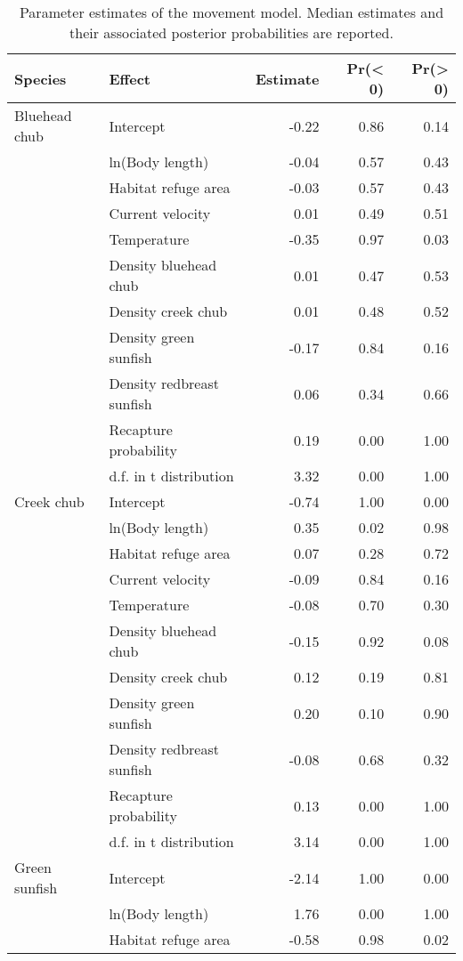 \begin{table}[ht]
\centering
\caption{Parameter estimates of the movement model. Median estimates and their associated posterior probabilities are reported.} 
\label{tab:coefficients}
\begin{tabular}{llrrr}
  \hline
Species & Effect & Estimate & Pr(< 0) & Pr(> 0) \\ 
  \hline
Bluehead chub & Intercept & -0.22 & 0.86 & 0.14 \\ 
   & ln(Body length) & -0.04 & 0.57 & 0.43 \\ 
   & Habitat refuge area & -0.03 & 0.57 & 0.43 \\ 
   & Current velocity & 0.01 & 0.49 & 0.51 \\ 
   & Temperature & -0.35 & 0.97 & 0.03 \\ 
   & Density bluehead chub & 0.01 & 0.47 & 0.53 \\ 
   & Density creek chub & 0.01 & 0.48 & 0.52 \\ 
   & Density green sunfish & -0.17 & 0.84 & 0.16 \\ 
   & Density redbreast sunfish & 0.06 & 0.34 & 0.66 \\ 
   & Recapture probability & 0.19 & 0.00 & 1.00 \\ 
   & d.f. in t distribution & 3.32 & 0.00 & 1.00 \\ 
  Creek chub & Intercept & -0.74 & 1.00 & 0.00 \\ 
   & ln(Body length) & 0.35 & 0.02 & 0.98 \\ 
   & Habitat refuge area & 0.07 & 0.28 & 0.72 \\ 
   & Current velocity & -0.09 & 0.84 & 0.16 \\ 
   & Temperature & -0.08 & 0.70 & 0.30 \\ 
   & Density bluehead chub & -0.15 & 0.92 & 0.08 \\ 
   & Density creek chub & 0.12 & 0.19 & 0.81 \\ 
   & Density green sunfish & 0.20 & 0.10 & 0.90 \\ 
   & Density redbreast sunfish & -0.08 & 0.68 & 0.32 \\ 
   & Recapture probability & 0.13 & 0.00 & 1.00 \\ 
   & d.f. in t distribution & 3.14 & 0.00 & 1.00 \\ 
  Green sunfish & Intercept & -2.14 & 1.00 & 0.00 \\ 
   & ln(Body length) & 1.76 & 0.00 & 1.00 \\ 
   & Habitat refuge area & -0.58 & 0.98 & 0.02 \\ 

\end{tabular}
\end{table}
